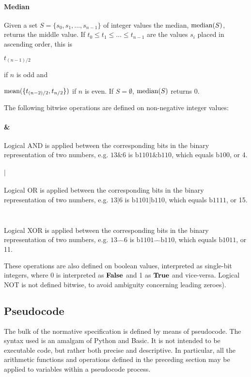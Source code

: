 \paragraph*{Median} Given a set $S=\{s_0, s_1, \hdots, s_{n-1} \}$ of integer values the median, $\operatorname{median}(S)$, 
returns the middle value. If $t_0\leq t_1\leq \hdots \leq t_{n-1}$ are the values $s_i$ placed in ascending order, this
is 

$t_{(n-1)/2}$ 

if $n$ is odd and

$\operatorname{mean}(\{ t_{(n-2)/2},t_{n/2}\})$ if $n$ is even. If $S=\emptyset$, $\operatorname{median}(S)$ returns 0.

The following bitwise operations are defined on non-negative integer values:
\paragraph*{\&} Logical AND is applied between the corresponding bits in the binary representation of two numbers, e.g.
$13\&6$ is $\text{b1101}\&\text{b110}$, which equals $\text{b100}$, or 4.

\paragraph*{$\mathbf{|}$} Logical OR is applied between the corresponding bits in the binary representation of two numbers, e.g.
$13|6$ is $\text{b1101}\text{|}\text{b110}$, which equals $\text{b1111}$, or 15.

\paragraph*{\Large$\hat\quad$} Logical XOR is applied between the corresponding bits in the binary representation of two numbers, e.g.
$13\hat\quad 6$ is $\text{b1101}\hat\quad\text{b110}$, which equals $\text{b1011}$, or 11.

These operations are also defined on boolean values, interpreted as single-bit integers, 
where 0 is interpreted as $\text{\bf{False}}$ and 1 as $\text{\bf{True}}$ and vice-versa. Logical NOT is 
not defined bitwise, to avoid ambiguity concerning leading zeroes).


\subsection{Pseudocode}
\label{pseudocode}

The bulk of the normative specification is defined by means of pseudocode. 
The syntax used is an amalgam of Python and Basic. It is not intended
to be executable code, but rather both precise and descriptive. 
In particular, all the arithmetic functions and
operations defined in the preceding section may be applied to variables within
a pseudocode process.

